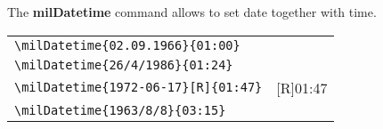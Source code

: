 \documentclass[a4paper,10pt]{scrarticle}
\begin{document}
\medskip\noindent{} The \textbf{milDatetime} command allows to set date together with time.

\par\medskip
\begin{tabular}{ll}
\verb+\milDatetime{02.09.1966}{01:00}+		& \milDatetime{02.09.1966}{01:00} \\	%
\verb+\milDatetime{26/4/1986}{01:24}+		& \milDatetime{26/4/1986}{01:24} \\ 	%
\verb+\milDatetime{1972-06-17}[R]{01:47}+	& \milDatetime{1972-06-17}[R]{01:47} \\	%
\verb+\milDatetime{1963/8/8}{03:15}+		& \milDatetime{1963/8/8}{03:15} \\		%

\end{tabular}
\end{document}
